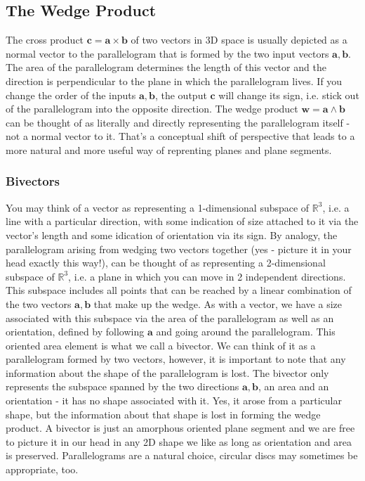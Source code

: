 \subsection{The Wedge Product}
The cross product $\mathbf{c = a \times b}$ of two vectors in 3D space is usually depicted as a normal vector to the parallelogram that is formed by the two input vectors $\mathbf{a,b}$. The area of the parallelogram determines the length of this vector and the direction is perpendicular to the plane in which the parallelogram lives. If you change the order of the inputs $\mathbf{a,b}$, the output  $\mathbf{c}$ will change its sign, i.e. stick out of the parallelogram into the opposite direction. The wedge product $\mathbf{w = a \wedge b}$ can be thought of as literally and directly representing the parallelogram itself - not a normal vector to it. That's a conceptual shift of perspective that leads to a more natural and more useful way of reprenting planes and plane segments.

\subsubsection{Bivectors}
You may think of a vector as representing a 1-dimensional subspace of $\mathbb{R}^3$, i.e. a line with a particular direction, with some indication of size attached to it via the vector's length and some idication of orientation via its sign. By analogy, the parallelogram arising from wedging two vectors together (yes - picture it in your head exactly this way!), can be thought of as representing a 2-dimensional subspace of $\mathbb{R}^3$, i.e. a plane in which you can move in 2 independent directions. This subspace includes all points that can be reached by a linear combination of the two vectors $\mathbf{a,b}$ that make up the wedge. As with a vector, we have a size associated with this subspace via the area of the parallelogram as well as an orientation, defined by following $\mathbf{a}$ and going around the parallelogram. This oriented area element is what we call a bivector. We can think of it as a parallelogram formed by two vectors, however, it is important to note that any information about the shape of the parallelogram is lost. The bivector only represents the subspace spanned by the two directions $\mathbf{a,b}$, an area and an orientation - it has no shape associated with it. Yes, it arose from a particular shape, but the information about that shape is lost in forming the wedge product. A bivector is just an amorphous oriented plane segment and we are free to picture it in our head in any 2D shape we like as long as orientation and area is preserved. Parallelograms are a natural choice, circular discs may sometimes be appropriate, too.

